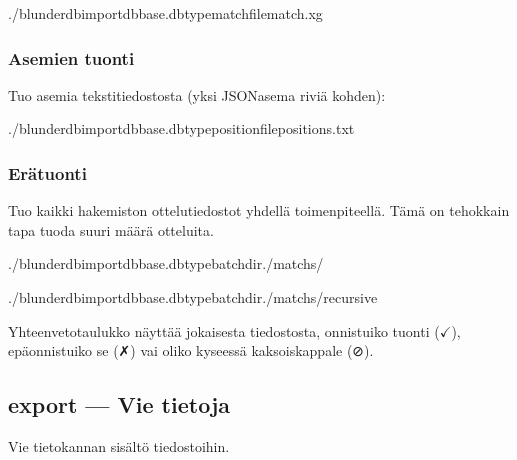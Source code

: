 \documentclass[letterpaper,10pt,finnish]{sphinxmanual}
\begin{document}
\begin{sphinxVerbatim}[commandchars=\\\{\}]
./blunderdbimport\PYGZhy{}\PYGZhy{}dbbase.db\PYGZhy{}\PYGZhy{}typematch\PYGZhy{}\PYGZhy{}filematch.xg
\end{sphinxVerbatim}


\subsubsection{Asemien tuonti}
\label{\detokenize{cli:import-de-positions}}
\sphinxAtStartPar
Tuo asemia tekstitiedostosta (yksi JSON\sphinxhyphen{}asema riviä kohden):

\begin{sphinxVerbatim}[commandchars=\\\{\}]
./blunderdbimport\PYGZhy{}\PYGZhy{}dbbase.db\PYGZhy{}\PYGZhy{}typeposition\PYGZhy{}\PYGZhy{}filepositions.txt
\end{sphinxVerbatim}


\subsubsection{Erätuonti}
\label{\detokenize{cli:import-par-lot}}
\sphinxAtStartPar
Tuo kaikki hakemiston ottelutiedostot yhdellä toimenpiteellä. Tämä on tehokkain tapa tuoda suuri määrä otteluita.

\begin{sphinxVerbatim}[commandchars=\\\{\}]
./blunderdbimport\PYGZhy{}\PYGZhy{}dbbase.db\PYGZhy{}\PYGZhy{}typebatch\PYGZhy{}\PYGZhy{}dir./matchs/

./blunderdbimport\PYGZhy{}\PYGZhy{}dbbase.db\PYGZhy{}\PYGZhy{}typebatch\PYGZhy{}\PYGZhy{}dir./matchs/\PYGZhy{}\PYGZhy{}recursive
\end{sphinxVerbatim}

\sphinxAtStartPar
Yhteenvetotaulukko näyttää jokaisesta tiedostosta, onnistuiko tuonti (\(\checkmark\)), epäonnistuiko se (✗) vai oliko kyseessä kaksoiskappale (⊘).


\subsection{export — Vie tietoja}
\label{\detokenize{cli:export-exporter-des-donnees}}
\sphinxAtStartPar
Vie tietokannan sisältö tiedostoihin.
\end{document}
